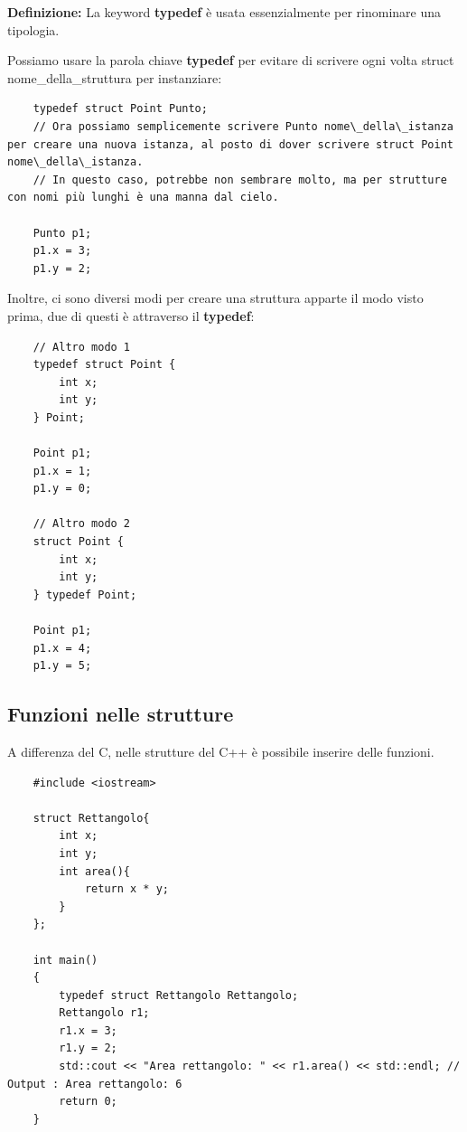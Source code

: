 \textsf{\small \textbf{Definizione: } La keyword \textbf{typedef} è usata essenzialmente per rinominare una tipologia.}

\textsf{\small Possiamo usare la parola chiave \textbf{typedef} per evitare di scrivere ogni volta struct nome\_della\_struttura per instanziare:} \\

\begin{lstlisting}
	typedef struct Point Punto;
	// Ora possiamo semplicemente scrivere Punto nome\_della\_istanza per creare una nuova istanza, al posto di dover scrivere struct Point nome\_della\_istanza.
	// In questo caso, potrebbe non sembrare molto, ma per strutture con nomi più lunghi è una manna dal cielo.
	
	Punto p1;
	p1.x = 3;
	p1.y = 2;
\end{lstlisting}

\textsf{\small Inoltre, ci sono diversi modi per creare una struttura apparte il modo visto prima, due di questi è attraverso il \textbf{typedef}: } \\

\begin{lstlisting}
	// Altro modo 1
	typedef struct Point {
		int x;
		int y;
	} Point;

	Point p1;
	p1.x = 1;
	p1.y = 0;
	
	// Altro modo 2
	struct Point {
		int x;
		int y;
	} typedef Point;

	Point p1;
	p1.x = 4;
	p1.y = 5;
\end{lstlisting}

\subsection{Funzioni nelle strutture} %

\textsf{\small A differenza del C, nelle strutture del C++ è possibile inserire delle funzioni.} \\

\begin{lstlisting}
	#include <iostream>
	
	struct Rettangolo{
		int x;
		int y;
		int area(){
			return x * y;
		}
	};

	int main()
	{
		typedef struct Rettangolo Rettangolo;
		Rettangolo r1;
		r1.x = 3;
		r1.y = 2;
		std::cout << "Area rettangolo: " << r1.area() << std::endl; // Output : Area rettangolo: 6
		return 0;
	}
\end{lstlisting}

